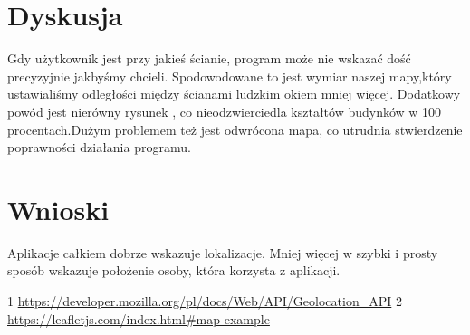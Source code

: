 \documentclass{classrep}
\begin{document}
\section{Dyskusja}
{Gdy użytkownik jest przy jakieś ścianie, program może nie wskazać dość precyzyjnie jakbyśmy chcieli. Spodowodowane to jest wymiar naszej mapy,który ustawialiśmy odległości między ścianami ludzkim okiem mniej więcej. Dodatkowy powód jest nierówny rysunek , co nieodzwierciedla kształtów budynków w 100 procentach.Dużym problemem też jest odwrócona mapa, co utrudnia stwierdzenie poprawności działania programu.}

\section{Wnioski}
{Aplikacje całkiem dobrze wskazuje lokalizacje. Mniej więcej w szybki i prosty sposób wskazuje położenie osoby, która korzysta z aplikacji.}

\begin{thebibliography}
{1} \url{https://developer.mozilla.org/pl/docs/Web/API/Geolocation_API}
{2} \url{https://leafletjs.com/index.html#map-example}
\end{thebibliography}
\end{document}
